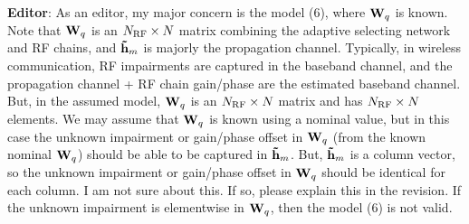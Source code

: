 \documentclass[a4paper,12pt]{article}
\begin{document}
\textbf{Editor}: As an editor, my major concern is the model (6), where ${{{\bf{W}}_q}}$ is known. Note that ${{{\bf{W}}_q}}$ is an ${{N_{{\rm{RF}}}} \times N}$ matrix combining the adaptive selecting network and RF chains,  and ${{{\bf{\tilde h}}_m}}$ is majorly the propagation channel. Typically, in wireless communication, RF impairments are captured in the baseband channel, and the propagation channel + RF chain gain/phase are the estimated baseband channel. But, in the assumed model, ${{{\bf{W}}_q}}$ is an ${{N_{{\rm{RF}}}} \times N}$ matrix and has ${{N_{{\rm{RF}}}} \times N}$ elements. We may assume that ${{{\bf{W}}_q}}$ is known using a nominal value, but in this case the unknown impairment or gain/phase offset in ${{{\bf{W}}_q}}$ (from the known nominal ${{{\bf{W}}_q}}$) should be able to be captured in ${{{\bf{\tilde h}}_m}}$. But, ${{{\bf{\tilde h}}_m}}$ is a column vector, so the unknown impairment or gain/phase offset in ${{{\bf{W}}_q}}$ should be identical for each column. I am not sure about this. If so, please explain this in the revision.  If the unknown impairment is elementwise in ${{{\bf{W}}_q}}$, then the model (6) is not valid.
\end{document}
